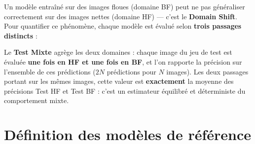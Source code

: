\documentclass[11pt,a4paper,openany]{book}
\begin{document}
Un modèle entraîné sur des images floues (domaine BF) peut ne pas généraliser correctement sur des images nettes (domaine HF) --- c'est le \textbf{Domain Shift}. Pour quantifier ce phénomène, chaque modèle est évalué selon \textbf{trois passages distincts} :

\begin{center}
\end{center}

\begin{hypothesebox}
  Le \textbf{Test Mixte} agrège les deux domaines : chaque image du jeu de test est évaluée \textbf{une fois en HF et une fois en BF}, et l'on rapporte la précision sur l'ensemble de ces prédictions ($2N$ prédictions pour $N$ images). Les deux passages portant sur les mêmes images, cette valeur est \textbf{exactement} la moyenne des précisions Test HF et Test BF : c'est un estimateur équilibré et déterministe du comportement mixte.
\end{hypothesebox}

\section{Définition des modèles de référence}
\end{document}
